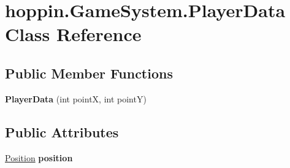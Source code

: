 \hypertarget{classhoppin_1_1_game_system_1_1_player_data}{}\section{hoppin.\+Game\+System.\+Player\+Data Class Reference}
\label{classhoppin_1_1_game_system_1_1_player_data}
\subsection*{Public Member Functions}
\begin{DoxyCompactItemize}
\item 
{\bfseries Player\+Data} (int pointX, int pointY)\hypertarget{classhoppin_1_1_game_system_1_1_player_data_a59f4b6a8422ce0ded6d274cd91edd931}{}\label{classhoppin_1_1_game_system_1_1_player_data_a59f4b6a8422ce0ded6d274cd91edd931}

\end{DoxyCompactItemize}
\subsection*{Public Attributes}
\begin{DoxyCompactItemize}
\item 
\hyperlink{classhoppin_1_1_game_system_1_1_position}{Position} {\bfseries position}\hypertarget{classhoppin_1_1_game_system_1_1_player_data_afd7b5bbb78b40b3183ce948390dbbaea}{}\label{classhoppin_1_1_game_system_1_1_player_data_afd7b5bbb78b40b3183ce948390dbbaea}

\end{DoxyCompactItemize}
